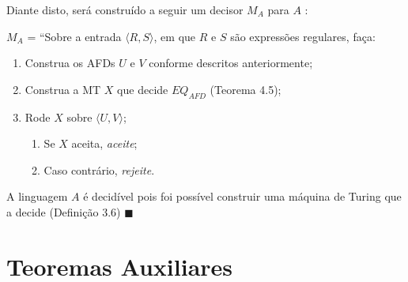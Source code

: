 \documentclass[12pt,a4paper,oneside]{article}
\begin{document}
\begin{enumerate}
{		Diante disto, será construído a seguir um decisor $M_A$ para $A$ :
		
		$M_A$ = ``Sobre a entrada $\langle R, S \rangle$, em que $R$ e $S$ são expressões regulares, faça:
		\begin{enumerate}
			\item Construa os AFDs $U$ e $V$ conforme descritos anteriormente;
			\item Construa a MT $X$ que decide $EQ_{AFD}$ (Teorema 4.5);
			\item Rode $X$ sobre $\langle U, V \rangle$;
			\begin{enumerate}
				\item Se $X$ aceita, {\it aceite};
				\item Caso contrário, {\it rejeite}.
			\end{enumerate}					
		\end{enumerate}
		
		A linguagem $A$ é decidível pois foi possível construir uma máquina de Turing que a decide (Definição 3.6) $\blacksquare$
		
	}
	
\end{enumerate}

\newpage

\section*{Teoremas Auxiliares}
\end{document}
